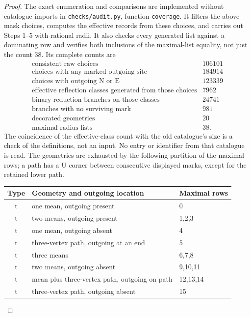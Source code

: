 \begin{proof}
The exact enumeration and comparisons are implemented without catalogue
imports in \texttt{checks/\allowbreak audit.py}, function \texttt{coverage}.
It filters the above mask choices, computes the effective records from
these choices, and carries out Steps 1--5 with rational radii. It also
checks every generated list against a dominating row and verifies
both inclusions of the maximal-list equality, not just the count 38.
Its complete counts are
\begin{equation}\label{ht:coveragecounts}
 \begin{array}{lr}
 \text{consistent raw choices}&106101\\
 \text{choices with any marked outgoing site}&184914\\
 \text{choices with outgoing N or E}&123339\\
 \text{effective reflection classes generated from those choices}&7962\\
 \text{binary reduction branches on those classes}&24741\\
 \text{branches with no surviving mark}&981\\
 \text{decorated geometries}&20\\
 \text{maximal radius lists}&38.
 \end{array}
\end{equation}
The coincidence of the effective-class count with the old catalogue's
size is a check of the definitions, not an input. No entry or identifier
from that catalogue is read. The geometries are exhausted by the
following partition of the maximal rows; a path has a U corner between
consecutive displayed marks, except for the retained lower path.
\begin{center}\small
\begin{tabular}{cll}
\toprule Type & Geometry and outgoing location & Maximal rows\\\midrule
 t & one mean, outgoing present & 0\\
 t & two means, outgoing present & 1,2,3\\
 t & one mean, outgoing absent & 4\\
 t & three-vertex path, outgoing at an end & 5\\
 t & three means & 6,7,8\\
 t & two means, outgoing absent & 9,10,11\\
 t & mean plus three-vertex path, outgoing on path & 12,13,14\\
 t & three-vertex path, outgoing absent & 15\\

\end{tabular}
\end{center}
\end{proof}
